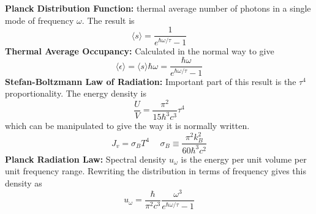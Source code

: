 \textbf{Planck Distribution Function: } thermal average number of photons in a single mode of frequency $\omega$. The result is
\[
\langle s \rangle = \frac{1}{e^{\hbar \omega/\tau}-1}
\]
\textbf{Thermal Average Occupancy:} Calculated in the normal way to give
\[
\langle \epsilon \rangle = \langle s \rangle \hbar \omega = 
\frac{\hbar \omega}{e^{\hbar \omega/\tau}-1}
\]
\textbf{Stefan-Boltzmann Law of Radiation:} Important part of this result is the $\tau^4$ proportionality. The energy density is
\[
\frac{U}{V} = \frac{\pi^2}{15\hbar^3c^3} \tau^4
\]
which can be manipulated to give the way it is normally written.
\[
J_v = \sigma_B T^4  \hspace{15pt} \sigma_B \equiv \frac{\pi^2k_B^2}{60\hbar^3c^2}
\]
\textbf{Planck Radiation Law:} Spectral density $u_\omega$ is the energy per unit volume per unit frequency range. Rewriting the distribution in terms of frequency gives this density as
\[
u_\omega = \frac{\hbar}{\pi^2c^3} \frac{\omega^3}{e^{\hbar \omega/\tau}-1}
\]

